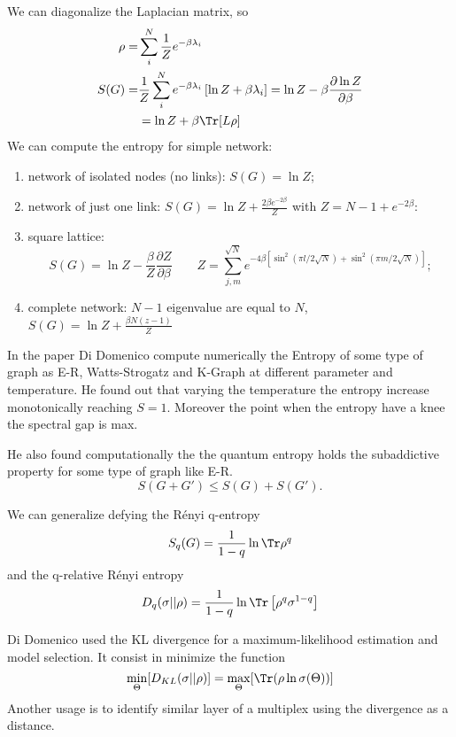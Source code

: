 We can diagonalize the Laplacian matrix, so 
\begin{equation}
    \begin{aligned}
        \rho =& \sum_i^N \frac{1}{Z} e^{-\beta \lambda_i} \\
        S(G) =& \frac{1}{Z} \sum_i^N e^{-\beta \lambda_i} \left[\ln Z + \beta \lambda_i \right]= \ln Z -\beta \frac{\partial \ln Z}{\partial\beta} \\
        &= \ln Z + \beta\Tr [L\rho]
    \end{aligned}
\end{equation}
We can compute the entropy for simple network:
\begin{enumerate}
    \item network of isolated nodes (no links): $S(G) = \ln Z$;
    \item network of just one link: $S(G) = \ln Z + \frac{2\beta e^{-2\beta}}{Z}$ with $Z= N-1+ e^{-2\beta}$:
    \item square lattice:
    \begin{equation}
        S(G) = \ln Z - \frac{\beta}{Z}\frac{\partial Z}{\partial \beta} \qquad Z = \sum_{j,m}^{\sqrt{N}} e^{-4\beta[\sin^2(\pi l/2\sqrt{N})+\sin^2(\pi m/2\sqrt{N})]};
    \end{equation}
    \item complete network: $N-1$ eigenvalue are equal to $N$, $S(G) = \ln Z + \frac{\beta N(z-1)}{Z}$
\end{enumerate}

In the paper Di Domenico compute numerically the Entropy of some type of graph as E-R, Watts-Strogatz and K-Graph at different parameter and temperature. He found out that varying the temperature the entropy increase monotonically reaching $S = 1$. Moreover the point when the entropy have a knee the spectral gap is max. 

He also found computationally the the quantum entropy holds the subaddictive property for some type of graph like E-R.
\begin{equation}
    S(G+G') \leq S(G) + S(G'). 
\end{equation}

We can generalize defying the Rényi q-entropy 
\begin{equation}
    S_q(G) = \frac{1}{1-q}\ln\Tr\rho^q
\end{equation}
and the q-relative Rényi entropy
\begin{equation}
    D_q(\sigma||\rho)= \frac{1}{1-q}\ln \Tr \left[ \rho^q \sigma^{1-q}\right]
\end{equation}

Di Domenico used the KL divergence for a maximum-likelihood estimation and model selection. It consist in minimize the function
\begin{equation}
    \min_\Theta[D_{KL}(\sigma||\rho)] = \max_\Theta[\Tr (\rho \ln \sigma(\Theta))]
\end{equation}
Another usage is to identify similar layer of a multiplex using the divergence as a distance.
